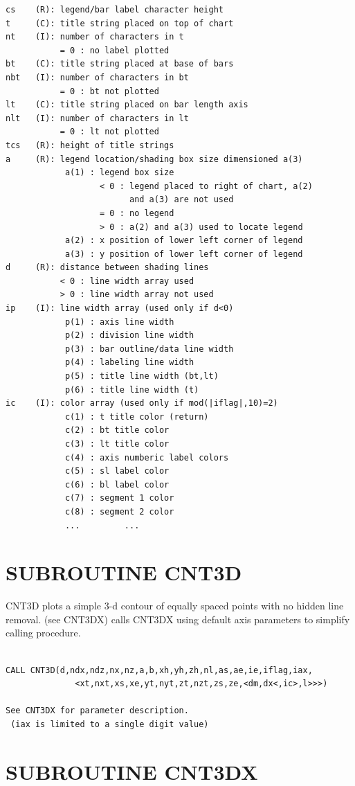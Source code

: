 \documentclass[11pt]{report}
\begin{document}
\begin{verbatim}
cs    (R): legend/bar label character height
t     (C): title string placed on top of chart
nt    (I): number of characters in t
           = 0 : no label plotted
bt    (C): title string placed at base of bars
nbt   (I): number of characters in bt
           = 0 : bt not plotted
lt    (C): title string placed on bar length axis
nlt   (I): number of characters in lt
           = 0 : lt not plotted
tcs   (R): height of title strings
a     (R): legend location/shading box size dimensioned a(3)
            a(1) : legend box size
                   < 0 : legend placed to right of chart, a(2)
                         and a(3) are not used
                   = 0 : no legend
                   > 0 : a(2) and a(3) used to locate legend
            a(2) : x position of lower left corner of legend
            a(3) : y position of lower left corner of legend
d     (R): distance between shading lines
           < 0 : line width array used
           > 0 : line width array not used
ip    (I): line width array (used only if d<0)
            p(1) : axis line width
            p(2) : division line width
            p(3) : bar outline/data line width
            p(4) : labeling line width
            p(5) : title line width (bt,lt)
            p(6) : title line width (t)
ic    (I): color array (used only if mod(|iflag|,10)=2)
            c(1) : t title color (return)
            c(2) : bt title color
            c(3) : lt title color
            c(4) : axis numberic label colors
            c(5) : sl label color
            c(6) : bl label color
            c(7) : segment 1 color
            c(8) : segment 2 color
            ...         ...
\end{verbatim}

\newpage
\section{SUBROUTINE CNT3D}

CNT3D plots a simple 3-d contour of equally spaced points with no hidden
line removal. (see CNT3DX)
 calls CNT3DX using default axis parameters to simplify calling
procedure.
\begin{verbatim}

CALL CNT3D(d,ndx,ndz,nx,nz,a,b,xh,yh,zh,nl,as,ae,ie,iflag,iax,
              <xt,nxt,xs,xe,yt,nyt,zt,nzt,zs,ze,<dm,dx<,ic>,l>>>)

See CNT3DX for parameter description.
 (iax is limited to a single digit value)
\end{verbatim}
\section{SUBROUTINE CNT3DX}
\end{document}
